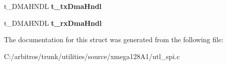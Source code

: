 \begin{DoxyCompactItemize}
\item 
\hypertarget{structt__spi_chan_hndl_a9841596d010decd729f14ee9aad7b2c8}{t\-\_\-\-D\-M\-A\-H\-N\-D\-L {\bfseries t\-\_\-tx\-Dma\-Hndl}}\label{structt__spi_chan_hndl_a9841596d010decd729f14ee9aad7b2c8}

\item 
\hypertarget{structt__spi_chan_hndl_a8ebbb56a16a0125906b1c87368aef8ee}{t\-\_\-\-D\-M\-A\-H\-N\-D\-L {\bfseries t\-\_\-rx\-Dma\-Hndl}}\label{structt__spi_chan_hndl_a8ebbb56a16a0125906b1c87368aef8ee}

\end{DoxyCompactItemize}


The documentation for this struct was generated from the following file\-:\begin{DoxyCompactItemize}
\item 
C\-:/arbitros/trunk/utilities/source/xmega128\-A1/utl\-\_\-spi.\-c\end{DoxyCompactItemize}
